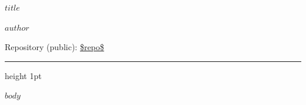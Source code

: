 \documentclass[10pt,a4paper]{article}
\begin{document}
{\color{hslu}\Large\bfseries $title$\par}
\vspace{0.35ex}
{\small $author$\par}
{\small Repository (public): \url{$repo$}\par}
\vspace{0.4ex}
{\color{hslu}\hrule height 1pt}
\vspace{0.6ex}

$body$
\end{document}
